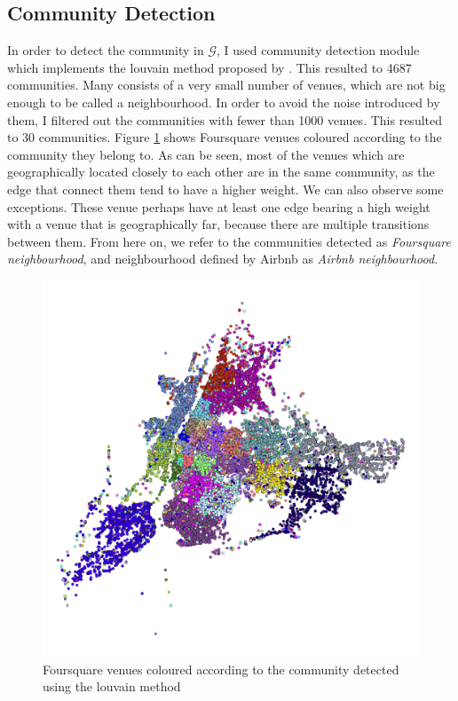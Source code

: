 \subsection{Community Detection}
In order to detect the community in $\mathcal{G}$, I used community detection module \citep{community} which implements the louvain method proposed by \cite{lambiotte2008geographical}. This resulted to 4687 communities. Many consists of a very small number of venues, which are not big enough to be called a neighbourhood. In order to avoid the noise introduced by them, I filtered out the communities with fewer than 1000 venues. This resulted to 30 communities. Figure \ref{fig:fsq-comm} shows Foursquare venues coloured according to the community they belong to. As can be seen, most of the venues which are geographically located closely to each other are in the same community, as the edge that connect them tend to have a higher weight. We can also observe some exceptions. These venue perhaps have at least one edge bearing a high weight with a venue that is geographically far, because there are multiple transitions between them. From here on, we refer to the communities detected as \emph{Foursquare neighbourhood}, and neighbourhood defined by Airbnb as \emph{Airbnb neighbourhood}.
\begin{figure}
\centering
\includegraphics[width=\columnwidth]{../fsq_foo_2.png}
\caption{Foursquare venues coloured according to the community detected using the louvain method}
\label{fig:fsq-comm}
\end{figure}
